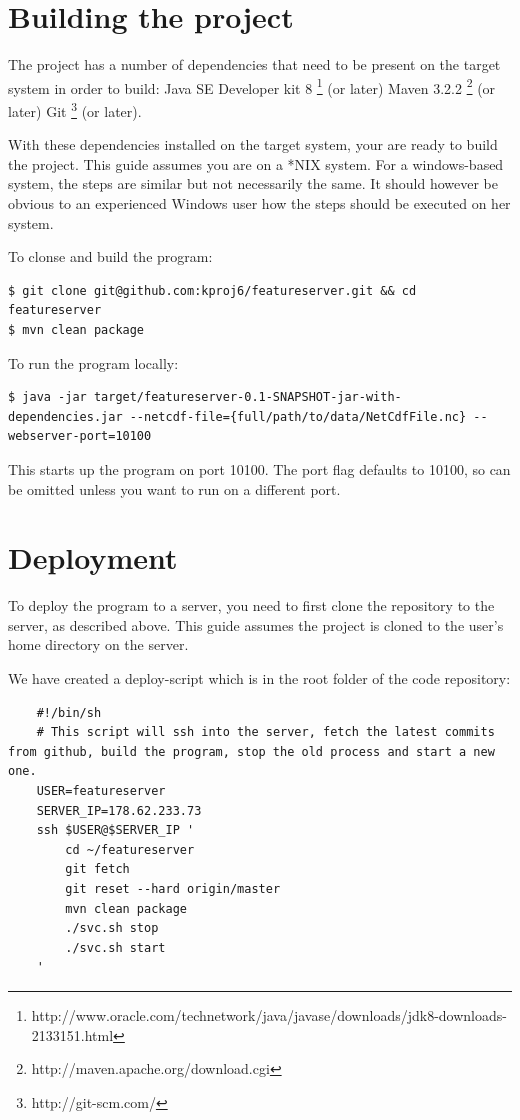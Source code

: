 \documentclass[11pt,a4paper,titlepage,oneside]{report}
\begin{document}
\section{Building the project}
The project has a number of dependencies that need to be present on the target system in order to build:
Java SE Developer kit 8 \footnote{http://www.oracle.com/technetwork/java/javase/downloads/jdk8-downloads-2133151.html} (or later)
Maven 3.2.2 \footnote{http://maven.apache.org/download.cgi} (or later)
Git \footnote{http://git-scm.com/} (or later).

With these dependencies installed on the target system, your are ready to build the project.
This guide assumes you are on a *NIX system. For a windows-based system, the steps are similar but not necessarily the same. It should however be obvious to an experienced Windows user how the steps should be executed on her system.

To clonse and build the program:
\begin{lstlisting}
$ git clone git@github.com:kproj6/featureserver.git && cd featureserver
$ mvn clean package
\end{lstlisting}

To run the program locally:
\begin{lstlisting}
$ java -jar target/featureserver-0.1-SNAPSHOT-jar-with-dependencies.jar --netcdf-file={full/path/to/data/NetCdfFile.nc} --webserver-port=10100
\end{lstlisting}

This starts up the program on port 10100. The port flag defaults to 10100, so can be omitted unless you want to run on a different port.

\section{Deployment}
To deploy the program to a server, you need to first clone the repository to the server, as described above.
This guide assumes the project is cloned to the user's home directory on the server.

We have created a deploy-script which is in the root folder of the code repository:
\begin{lstlisting}
	#!/bin/sh
	# This script will ssh into the server, fetch the latest commits from github, build the program, stop the old process and start a new one.
	USER=featureserver
	SERVER_IP=178.62.233.73
	ssh $USER@$SERVER_IP '
	    cd ~/featureserver
	    git fetch
	    git reset --hard origin/master
	    mvn clean package
	    ./svc.sh stop
	    ./svc.sh start
	'
\end{lstlisting}
\end{document}
